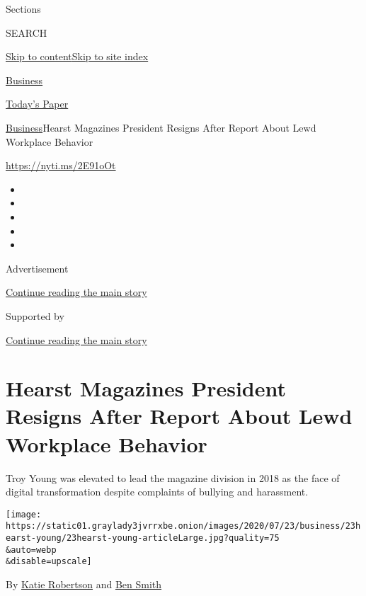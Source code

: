 Sections

SEARCH

\protect\hyperlink{site-content}{Skip to
content}\protect\hyperlink{site-index}{Skip to site index}

\href{https://www.nytimes3xbfgragh.onion/section/business}{Business}

\href{https://myaccount.nytimes3xbfgragh.onion/auth/login?response_type=cookie\&client_id=vi}{}

\href{https://www.nytimes3xbfgragh.onion/section/todayspaper}{Today's
Paper}

\href{/section/business}{Business}\textbar{}Hearst Magazines President
Resigns After Report About Lewd Workplace Behavior

\url{https://nyti.ms/2E91oOt}

\begin{itemize}
\item
\item
\item
\item
\item
\end{itemize}

Advertisement

\protect\hyperlink{after-top}{Continue reading the main story}

Supported by

\protect\hyperlink{after-sponsor}{Continue reading the main story}

\hypertarget{hearst-magazines-president-resigns-after-report-about-lewd-workplace-behavior}{%
\section{Hearst Magazines President Resigns After Report About Lewd
Workplace
Behavior}\label{hearst-magazines-president-resigns-after-report-about-lewd-workplace-behavior}}

Troy Young was elevated to lead the magazine division in 2018 as the
face of digital transformation despite complaints of bullying and
harassment.

\texttt{[image: https://static01.graylady3jvrrxbe.onion/images/2020/07/23/business/23hearst-young/23hearst-young-articleLarge.jpg?quality=75\\\&auto=webp\\\&disable=upscale]}

By \href{https://www.nytimes3xbfgragh.onion/by/katie-robertson}{Katie
Robertson} and
\href{https://www.nytimes3xbfgragh.onion/by/ben-smith}{Ben Smith}

